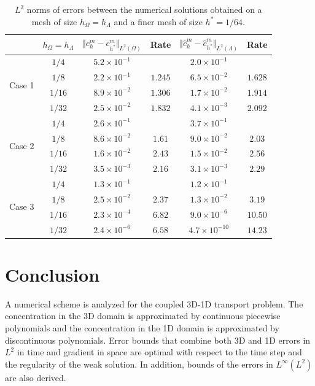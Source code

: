 \documentclass[pdflatex,sn-mathphys-num]{sn-jnl}%
\theoremstyle{thmstyleone}%
\theoremstyle{thmstyletwo}%
\theoremstyle{thmstylethree}%
\begin{document}
\begin{table}[h!]
    \centering
    \caption{$L^2$ norms of errors between the numerical solutions obtained on a mesh of size $h_\Omega=h_\Lambda$ and a finer mesh of size $h^\ast = 1/64$. }
    \begin{tabular}{|c|c|c|c|c|c|}
    \hline
    & $h_\Omega = h_\Lambda$ & $\displaystyle\Vert c_h^m - c_{h^\ast}^m \Vert_{L^2(\Omega)}$ & Rate  & $\displaystyle \Vert \hat c_h^m - \hat c_{h^\ast}^m \Vert_{L^2(\Lambda)}$ & Rate \\
        \hline 
         \multirow{4}{3em}{Case 1} &
        $1/4$ & $5.2\times 10^{-1}$  & &  $2.0 \times 10^{-1}$ & \\
        & $1/8$ & $2.2 \times 10^{-1}$ & $1.245$  & $6.5 \times 10^{-2}$ & $1.628$\\
        & $1/16$ & $8.9\times 10^{-2}$ & $1.306$  & $1.7 \times 10^{-2}$  & $1.914$ \\
        & $1/32$ & $2.5\times 10 ^{-2}$ & $1.832$   & $4.1 \times 10^{-3}$ & $2.092$ \\
        \hline
        \multirow{4}{3em}{Case 2} & $1/4$ & $2.6\times10^{-1}$ & & $3.7\times10^{-1}$ & \\
        & $1/8$ & $8.6\times10^{-2}$ & $1.61$ & $9.0\times10^{-2}$ & $2.03$ \\
        & $1/16$ & $1.6\times10^{-2}$ & $2.43$ & $1.5\times10^{-2}$ & $2.56$ \\
        & $1/32$ & $3.5\times10^{-3}$ & $2.16$ & $3.1\times10^{-3}$ & $2.29$ \\
        \hline
        \multirow{4}{3em}{Case 3} & $1/4$ & $1.3\times10^{-1}$ & & $1.2\times10^{-1}$ & \\
        & $1/8$ & $2.5 \times 10^{-2}$ & $2.37$  & $1.3 \times 10^{-2}$ & $3.19$ \\
        & $1/16$ & $2.3\times 10^{-4}$ & $6.82$ & $9.0\times 10^{-6}$ & $10.50$ \\
        & $1/32$ & $2.4 \times 10^{-6}$ & $6.58$ & $4.7 \times 10^{-10}$ & $14.23$\\
        \hline
    \end{tabular}
    \label{tab:diagconv}
\end{table}



\section{Conclusion}
\label{sec:conclusion}

A numerical scheme is analyzed for the coupled 3D-1D transport problem. The concentration in the 3D domain is approximated by continuous piecewise polynomials and the concentration in the 1D domain is approximated by discontinuous polynomials. Error bounds that combine both 3D and 1D errors in $L^2$ in time and gradient in space are optimal with respect to the time step and the regularity of the weak solution. In addition, bounds of the errors in $L^\infty(L^2)$ are also derived.
\end{document}
